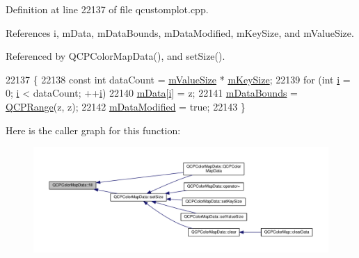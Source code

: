 Definition at line 22137 of file qcustomplot.\+cpp.



References i, m\+Data, m\+Data\+Bounds, m\+Data\+Modified, m\+Key\+Size, and m\+Value\+Size.



Referenced by Q\+C\+P\+Color\+Map\+Data(), and set\+Size().


\begin{DoxyCode}
22137                                    \{
22138   \textcolor{keyword}{const} \textcolor{keywordtype}{int} dataCount = \hyperlink{class_q_c_p_color_map_data_ae8ee9093632a59f55eb4fc06579ed256}{mValueSize} * \hyperlink{class_q_c_p_color_map_data_a354e06462023340fbc03894b22499f6d}{mKeySize};
22139   \textcolor{keywordflow}{for} (\textcolor{keywordtype}{int} \hyperlink{_comparision_pictures_2_createtest_image_8m_a6f6ccfcf58b31cb6412107d9d5281426}{i} = 0; \hyperlink{_comparision_pictures_2_createtest_image_8m_a6f6ccfcf58b31cb6412107d9d5281426}{i} < dataCount; ++\hyperlink{_comparision_pictures_2_createtest_image_8m_a6f6ccfcf58b31cb6412107d9d5281426}{i})
22140     \hyperlink{class_q_c_p_color_map_data_ac1682862022f575191351c9825187d39}{mData}[\hyperlink{_comparision_pictures_2_createtest_image_8m_a6f6ccfcf58b31cb6412107d9d5281426}{i}] = z;
22141   \hyperlink{class_q_c_p_color_map_data_a1798b3dcc0a27091d196bfd156dcb3f2}{mDataBounds} = \hyperlink{class_q_c_p_range}{QCPRange}(z, z);
22142   \hyperlink{class_q_c_p_color_map_data_ad3cc682da2ac14e5acdbc05cf4d3d93b}{mDataModified} = \textcolor{keyword}{true};
22143 \}
\end{DoxyCode}


Here is the caller graph for this function\+:\nopagebreak
\begin{figure}[H]
\begin{center}
\leavevmode
\includegraphics[width=350pt]{class_q_c_p_color_map_data_a350f783260eb9b5de5c7b5e0d5d3e3c2_icgraph}
\end{center}
\end{figure}


\hypertarget{class_q_c_p_color_map_data_a986009324aee1fc5f696db46bd03dde5}{}
